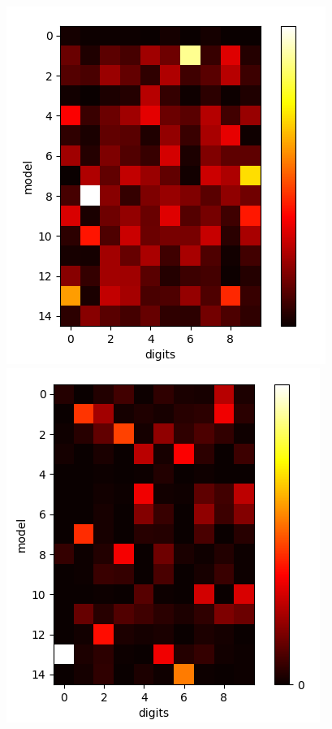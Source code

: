 \documentclass{article}
\begin{document}
\begin{minipage}{0.5\textwidth}
\includegraphics[scale=0.3]{pics/mnist_assign_0.png}
\includegraphics[scale=0.3]{pics/mnist_assign_99.png}
\end{minipage}\label{fig:mnist_assign}
\end{document}
